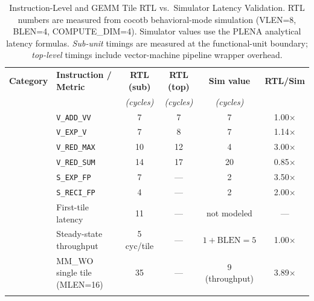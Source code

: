 
\usepackage{booktabs}
\usepackage{multirow}


\begin{table}[t]
\centering
\caption{Instruction-Level and GEMM Tile RTL vs.\ Simulator Latency Validation.
  RTL numbers are measured from cocotb behavioral-mode simulation (VLEN=8, BLEN=4,
  COMPUTE\_DIM=4). Simulator values use the PLENA analytical latency formulas.
  \emph{Sub-unit} timings are measured at the functional-unit boundary;
  \emph{top-level} timings include vector-machine pipeline wrapper overhead.}
\label{tab:rtl_validation}
\begin{tabular}{@{}llcccc@{}}
\toprule
\textbf{Category} & \textbf{Instruction / Metric} &
  \textbf{RTL (sub)} & \textbf{RTL (top)} &
  \textbf{Sim value} & \textbf{RTL/Sim} \\
& & \textit{(cycles)} & \textit{(cycles)} & \textit{(cycles)} & \\
\midrule
{}
  & \texttt{V\_ADD\_VV}    & 7  & 7  & 7  & 1.00$\times$ \\
  & \texttt{V\_EXP\_V}     & 7  & 8  & 7  & 1.14$\times$ \\
  & \texttt{V\_RED\_MAX}   & 10 & 12 & 4  & 3.00$\times$ \\
  & \texttt{V\_RED\_SUM}   & 14 & 17 & 20 & 0.85$\times$ \\
  & \texttt{S\_EXP\_FP}    & 7  & —  & 2  & 3.50$\times$ \\
  & \texttt{S\_RECI\_FP}   & 4  & —  & 2  & 2.00$\times$ \\
\midrule
{}
  & First-tile latency             & 11 & — & not modeled & — \\
  & Steady-state throughput        & 5 cyc/tile & — & $1+\text{BLEN}=5$ & 1.00$\times$ \\
  & MM\_WO single tile (MLEN=16)   & 35 & — & 9 (throughput) & 3.89$\times$ \\
\midrule
{}

\end{tabular}
\end{table}
